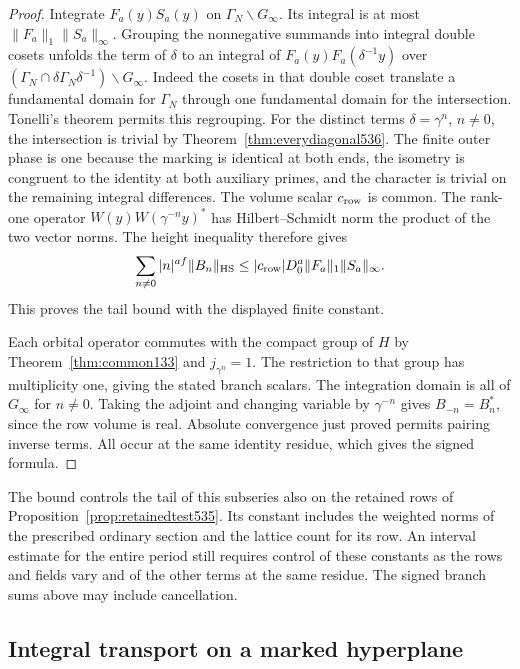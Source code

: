 \documentclass[a4paper,11pt]{article}
\theoremstyle{definition}
\theoremstyle{remark}
\numberwithin{equation}{section}
\begin{document}
\begin{proof}
Integrate \(F_a(y)S_a(y)\) on \(\Gamma_N\backslash G_\infty\).
Its integral is at most \(\|F_a\|_1\|S_a\|_\infty\).
Grouping the nonnegative summands into integral double cosets
unfolds the term of \(\delta\) to an integral of
\(F_a(y)F_a(\delta^{-1}y)\) over
\((\Gamma_N\cap\delta\Gamma_N\delta^{-1})\backslash G_\infty\).
Indeed the cosets in that double coset translate a fundamental
domain for \(\Gamma_N\) through one fundamental domain for the
intersection. Tonelli's theorem permits this regrouping.
For the distinct terms \(\delta=\gamma^n\), \(n\ne0\), the
intersection is trivial by Theorem~\ref{thm:everydiagonal536}.
The finite outer phase is one because the marking is identical
at both ends, the isometry is congruent to the identity at
both auxiliary primes, and the character is trivial on the
remaining integral differences. The volume scalar \(c_{\rm row}\)
is common. The rank-one operator \(W(y)W(\gamma^{-n}y)^*\)
has Hilbert--Schmidt norm the product of the two vector norms.
The height inequality therefore gives
\[
       \sum_{n\ne0}|n|^{af}\|B_n\|_{\rm HS}
          \le |c_{\rm row}|D_0^a\|F_a\|_1\|S_a\|_\infty .
\]
This proves the tail bound with the displayed finite constant.

Each orbital operator commutes with the compact group of \(H\)
by Theorem~\ref{thm:common133} and \(j_{\gamma^n}=1\). The
restriction to that group has multiplicity one, giving the
stated branch scalars. The integration domain is all of
\(G_\infty\) for \(n\ne0\). Taking the adjoint and changing
variable by \(\gamma^{-n}\) gives \(B_{-n}=B_n^*\), since the
row volume is real. Absolute convergence just proved permits
pairing inverse terms. All occur at the same identity residue,
which gives the signed formula.
\end{proof}

The bound controls the tail of this subseries also on the
retained rows of Proposition~\ref{prop:retainedtest535}. Its
constant includes the weighted norms of the prescribed ordinary
section and the lattice count for its row. An interval estimate
for the entire period still requires control of these constants
as the rows and fields vary and of the other terms at the same
residue. The signed branch sums above may include cancellation.


\subsection{Integral transport on a marked hyperplane}
\label{sec:parabolic537}
\end{document}
